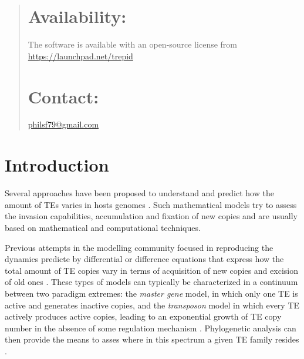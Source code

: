 \documentclass{bioinfo}
\begin{document}
\begin{abstract}
\section{Availability:}
The software is available with an open-source license from
\url{https://launchpad.net/trepid}


\section{Contact:} 
\href{philsf79@gmail.com}{philsf79@gmail.com}
\end{abstract}

\section{Introduction} 

Several approaches have been proposed to understand and predict how
the amount of TEs varies in hosts genomes
\citep{rouzic2005,HCX+05,SKR05}. Such mathematical models try to
assess the invasion capabilities, accumulation and fixation of new
copies and are usually based on mathematical and computational
techniques.

Previous attempts in the modelling community focused in reproducing
the dynamics predicte by differential or difference equations that
express how the total amount of TE copies vary in terms of acquisition
of new copies and excision of old ones
\citep{QA97,QA98,DCB05,DLC+06}.%
These types of models can typically be characterized in a continuum
between two paradigm extremes: the \emph{master gene} model, in which
only one TE is active and generates inactive copies, and the
\emph{transposon} model in which every TE actively produces active
copies, leading to an exponential growth of TE copy number in the
absence of some regulation mechanism \citep{KRP05}. Phylogenetic
analysis can then provide the means to asses where in this spectrum a
given TE family resides \citep{BJ06,JB06}.
\end{document}
